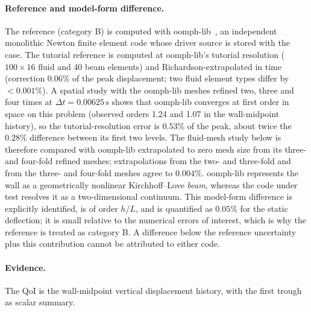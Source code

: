 \paragraph{Reference and model-form difference.}
The reference (category B) is computed with oomph-lib~\citep{Heil2006}, an independent monolithic Newton finite element code whose driver source is stored with the case.
The tutorial reference is computed at oomph-lib's tutorial resolution ($100\times16$ fluid and 40 beam elements) and Richardson-extrapolated in time (correction $0.06\%$ of the peak displacement; two fluid element types differ by $<0.001\%$). A spatial study with the oomph-lib meshes refined two, three and four times at $\Delta t = 0.00625\,\mathrm{s}$ shows that oomph-lib converges at first order in space on this problem (observed orders 1.24 and 1.07 in the wall-midpoint history), so the tutorial-resolution error is $0.53\%$ of the peak, about twice the $0.28\%$ difference between its first two levels. The fluid-mesh study below is therefore compared with oomph-lib extrapolated to zero mesh size from its three- and four-fold refined meshes; extrapolations from the two- and three-fold and from the three- and four-fold meshes agree to $0.004\%$.
oomph-lib represents the wall as a geometrically nonlinear Kirchhoff--Love \emph{beam}, whereas the code under test resolves it as a two-dimensional continuum.
This model-form difference is explicitly identified, is of order $h/L$, and is quantified as $0.05\%$ for the static deflection; it is small relative to the numerical errors of interest, which is why the reference is treated as category B.
A difference below the reference uncertainty plus this contribution cannot be attributed to either code.

\paragraph{Evidence.}
The QoI is the wall-midpoint vertical displacement history, with the first trough as scalar summary.

